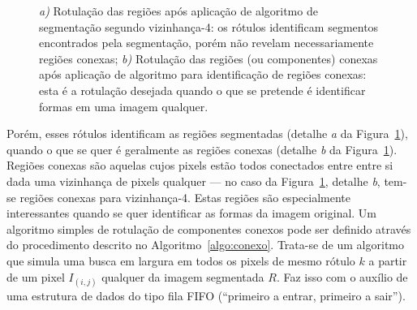 \begin{figure}[ht!]
\begin{center}


      \caption{\textit{a)} Rotulação das regiões após aplicação de algoritmo de
        segmentação segundo vizinhança-4: os rótulos identificam segmentos
        encontrados pela segmentação, porém não revelam necessariamente regiões
        conexas; \textit{b)} Rotulação das regiões (ou componentes) conexas após
        aplicação de algoritmo para identificação de regiões conexas: esta é a
        rotulação desejada quando o que se pretende é identificar formas em uma
        imagem qualquer.}
        \label{fig:rotulacao}
\end{center}
\end{figure}


Porém, esses rótulos identificam as regiões segmentadas (detalhe
\textit{a} da Figura~\ref{fig:rotulacao}), quando o que se quer é
geralmente as regiões conexas (detalhe \textit{b} da
Figura~\ref{fig:rotulacao}). Regiões conexas são aquelas cujos pixels
estão todos conectados entre entre si dada uma vizinhança de pixels
qualquer --- no caso da Figura~\ref{fig:rotulacao}, detalhe
\textit{b}, tem-se regiões conexas para vizinhança-4. Estas regiões
são especialmente interessantes quando se quer identificar as formas
da imagem original. Um algoritmo simples de rotulação de componentes
conexos pode ser definido através do procedimento descrito no
Algoritmo~\ref{algo:conexo}. Trata-se de um algoritmo que simula uma
busca em largura em todos os pixels de mesmo rótulo $k$ a partir de um
pixel $I_{(i,j)}$ qualquer da imagem segmentada $R$. Faz isso com o
auxílio de uma estrutura de dados do tipo fila FIFO (``primeiro a
entrar, primeiro a sair'').

